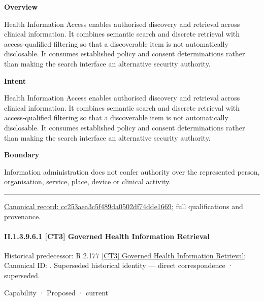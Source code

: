 \textbf{Overview}



Health Information Access enables authorised discovery and retrieval across clinical information. It combines semantic search and discrete retrieval with access-qualified filtering so that a discoverable item is not automatically disclosable. It consumes established policy and consent determinations rather than making the search interface an alternative security authority.



\textbf{Intent}



Health Information Access enables authorised discovery and retrieval across clinical information. It combines semantic search and discrete retrieval with access-qualified filtering so that a discoverable item is not automatically disclosable. It consumes established policy and consent determinations rather than making the search interface an alternative security authority.



\textbf{Boundary}



Information administration does not confer authority over the represented person, organisation, service, place, device or clinical activity.



\medskip\hrule\medskip

{\footnotesize \href{../../../../continuum/strategy/capability/cc253aea3c5f489da0502df74dde1669.md}{Canonical record: cc253aea3c5f489da0502df74dde1669}; full qualifications and provenance.}\par
\paragraph*{II.1.3.9.6.1 [CT3] Governed Health Information Retrieval}
\label{navigation:II.1.3.9.6.1}

{\small Historical predecessor: R.2.177 \hyperref[element:90b838d703dd472b8b6d74961f3a748c]{[CT3] Governed Health Information Retrieval}; Canonical ID: \texttt{}. Superseded historical identity — direct correspondence · superseded.}\par
\label{element:76e74e46ca4d44a1a7bb116b358f231c}
{\small Capability · Proposed · current}\par

